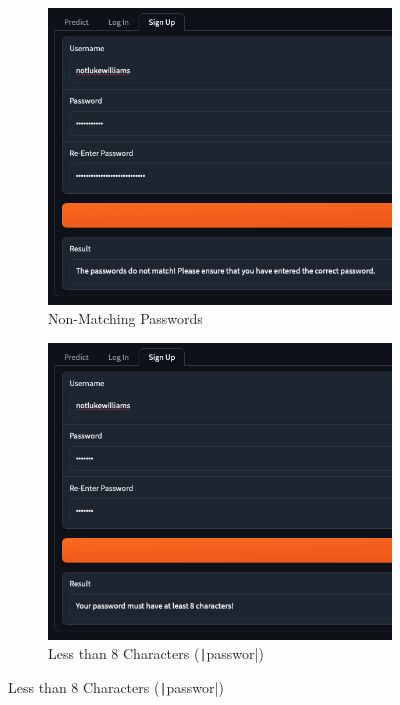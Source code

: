 \documentclass[12pt]{report}
\newcommand{\pil}[1]{\protect\texttt|#1|}
\begin{document}
\begin{figure}[H]
\centering
\begin{subfigure}{.45\linewidth}
    \centering
    \includegraphics[width=\linewidth]{ss15.8a.png}
    \caption{Non-Matching Passwords}
\end{subfigure}
\begin{subfigure}{.45\linewidth}
    \centering
    \includegraphics[width=\linewidth]{ss15.8b.png}
    \caption{Less than 8 Characters (\pil{passwor})}
\end{subfigure}


\end{figure}
\end{document}
